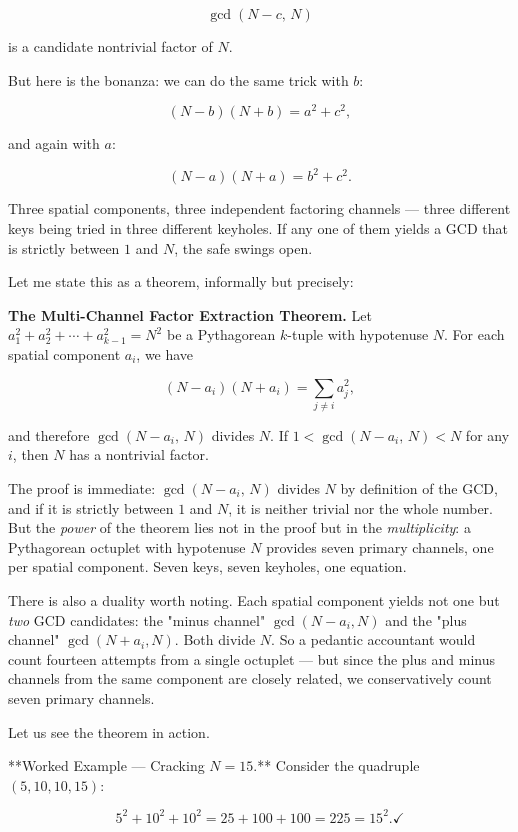 \[
\gcd(N - c, \, N)
\]

is a candidate nontrivial factor of $N$.

But here is the bonanza: we can do the same trick with $b$:

\[
(N - b)(N + b) = a^2 + c^2,
\]

and again with $a$:

\[
(N - a)(N + a) = b^2 + c^2.
\]

Three spatial components, three independent factoring channels --- three different keys being tried in three different keyholes. If any one of them yields a GCD that is strictly between $1$ and $N$, the safe swings open.

Let me state this as a theorem, informally but precisely:


\begin{displayquote}
\textbf{The Multi-Channel Factor Extraction Theorem.} Let $a_1^2 + a_2^2 + \cdots + a_{k-1}^2 = N^2$ be a Pythagorean $k$-tuple with hypotenuse $N$. For each spatial component $a_i$, we have

$$(N - a_i)(N + a_i) = \sum_{j \ne i} a_j^2,$$

and therefore $\gcd(N - a_i, \, N)$ divides $N$. If $1 < \gcd(N - a_i, \, N) < N$ for any $i$, then $N$ has a nontrivial factor.
\end{displayquote}


The proof is immediate: $\gcd(N - a_i, \, N)$ divides $N$ by definition of the GCD, and if it is strictly between $1$ and $N$, it is neither trivial nor the whole number. But the \textit{power} of the theorem lies not in the proof but in the \textit{multiplicity}: a Pythagorean octuplet with hypotenuse $N$ provides seven primary channels, one per spatial component. Seven keys, seven keyholes, one equation.

There is also a duality worth noting. Each spatial component yields not one but \textit{two} GCD candidates: the "minus channel" $\gcd(N - a_i, N)$ and the "plus channel" $\gcd(N + a_i, N)$. Both divide $N$. So a pedantic accountant would count fourteen attempts from a single octuplet --- but since the plus and minus channels from the same component are closely related, we conservatively count seven primary channels.

Let us see the theorem in action.

**Worked Example --- Cracking $N = 15$.** Consider the quadruple $(5, 10, 10, 15)$:

\[
5^2 + 10^2 + 10^2 = 25 + 100 + 100 = 225 = 15^2. \checkmark
\]

